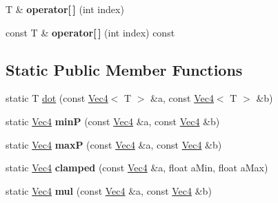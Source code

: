 \begin{DoxyCompactItemize}
\item 
\hypertarget{classps_1_1base_1_1Vec4_aac0b7299ed1457a7547125319e088f3f}{}T \& {\bfseries operator\mbox{[}$\,$\mbox{]}} (int index)\label{classps_1_1base_1_1Vec4_aac0b7299ed1457a7547125319e088f3f}

\item 
\hypertarget{classps_1_1base_1_1Vec4_a860d63c00daef321d26fabc34b7a5b0c}{}const T \& {\bfseries operator\mbox{[}$\,$\mbox{]}} (int index) const \label{classps_1_1base_1_1Vec4_a860d63c00daef321d26fabc34b7a5b0c}

\end{DoxyCompactItemize}
\subsection*{Static Public Member Functions}
\begin{DoxyCompactItemize}
\item 
static T \hyperlink{classps_1_1base_1_1Vec4_adefe9e133f7b0a96c2eb45a68965ec50}{dot} (const \hyperlink{classps_1_1base_1_1Vec4}{Vec4}$<$ T $>$ \&a, const \hyperlink{classps_1_1base_1_1Vec4}{Vec4}$<$ T $>$ \&b)
\item 
\hypertarget{classps_1_1base_1_1Vec4_aa4643d010244c9115c0b429281e1e558}{}static \hyperlink{classps_1_1base_1_1Vec4}{Vec4} {\bfseries min\+P} (const \hyperlink{classps_1_1base_1_1Vec4}{Vec4} \&a, const \hyperlink{classps_1_1base_1_1Vec4}{Vec4} \&b)\label{classps_1_1base_1_1Vec4_aa4643d010244c9115c0b429281e1e558}

\item 
\hypertarget{classps_1_1base_1_1Vec4_ae99f725f850c406bb39e55a5f6468b49}{}static \hyperlink{classps_1_1base_1_1Vec4}{Vec4} {\bfseries max\+P} (const \hyperlink{classps_1_1base_1_1Vec4}{Vec4} \&a, const \hyperlink{classps_1_1base_1_1Vec4}{Vec4} \&b)\label{classps_1_1base_1_1Vec4_ae99f725f850c406bb39e55a5f6468b49}

\item 
\hypertarget{classps_1_1base_1_1Vec4_aa8483bfd45e555daa2152fc4e5ad86fc}{}static \hyperlink{classps_1_1base_1_1Vec4}{Vec4} {\bfseries clamped} (const \hyperlink{classps_1_1base_1_1Vec4}{Vec4} \&a, float a\+Min, float a\+Max)\label{classps_1_1base_1_1Vec4_aa8483bfd45e555daa2152fc4e5ad86fc}

\item 
\hypertarget{classps_1_1base_1_1Vec4_acdf7d59ec64aa6b962bf8daa5ef5aca3}{}static \hyperlink{classps_1_1base_1_1Vec4}{Vec4} {\bfseries mul} (const \hyperlink{classps_1_1base_1_1Vec4}{Vec4} \&a, const \hyperlink{classps_1_1base_1_1Vec4}{Vec4} \&b)\label{classps_1_1base_1_1Vec4_acdf7d59ec64aa6b962bf8daa5ef5aca3}


\end{DoxyCompactItemize}
